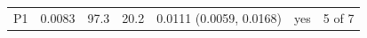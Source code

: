 \begin{tabular}{lrrrrlr}
P1 & 0.0083 & 97.3 & 20.2 & 0.0111 (0.0059, 0.0168) & yes & 5 of 7 \\

\end{tabular}
